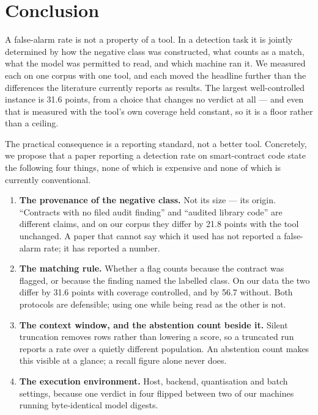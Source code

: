 \documentclass[sigconf,nonacm]{acmart}
\begin{document}
\section{Conclusion}

A false-alarm rate is not a property of a tool. In a detection task it is jointly
determined by how the negative class was constructed, what counts as a match,
what the model was permitted to read, and which machine ran it. We measured each
on one corpus with one tool, and each moved the headline further than the
differences the literature currently reports as results. The largest
well-controlled instance is 31.6 points, from a choice that changes no verdict at
all --- and even that is measured with the tool's own coverage held constant, so
it is a floor rather than a ceiling.

The practical consequence is a reporting standard, not a better tool. Concretely,
we propose that a paper reporting a detection rate on smart-contract code state
the following four things, none of which is expensive and none of which is
currently conventional.

\begin{enumerate}
\item \textbf{The provenance of the negative class.} Not its size --- its origin.
  ``Contracts with no filed audit finding'' and ``audited library code'' are
  different claims, and on our corpus they differ by 21.8 points with the tool
  unchanged. A paper that cannot say which it used has not reported a false-alarm
  rate; it has reported a number.
\item \textbf{The matching rule.} Whether a flag counts because the contract was
  flagged, or because the finding named the labelled class. On our data the two
  differ by 31.6 points with coverage controlled, and by 56.7 without. Both
  protocols are defensible; using one while being read as the other is not.
\item \textbf{The context window, and the abstention count beside it.} Silent
  truncation removes rows rather than lowering a score, so a truncated run reports
  a rate over a quietly different population. An abstention count makes this
  visible at a glance; a recall figure alone never does.
\item \textbf{The execution environment.} Host, backend, quantisation and batch
  settings, because one verdict in four flipped between two of our machines
  running byte-identical model digests.
\end{enumerate}
\end{document}
